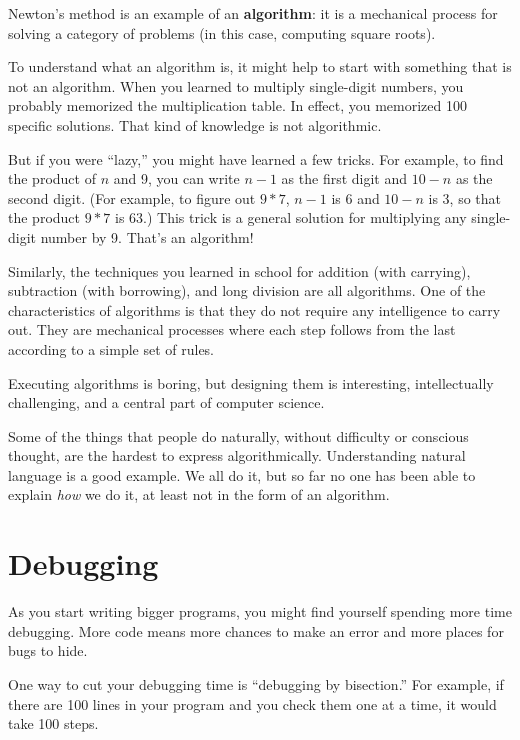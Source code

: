 Newton's method is an example of an {\bf algorithm}: it is a
mechanical process for solving a category of problems (in this
case, computing square roots).

To understand what an algorithm is, it might help to start with
something that is not an algorithm.  When you learned to multiply
single-digit numbers, you probably memorized the multiplication table.
In effect, you memorized 100 specific solutions.  That kind of
knowledge is not algorithmic.

But if you were ``lazy,'' you might have learned a few
tricks.  For example, to find the product of $n$ and 9, you can
write $n-1$ as the first digit and $10-n$ as the second
digit.  (For example, to figure out $9*7$, $n-1$ is 6 and 
$10-n$ is 3, so that the product $9*7$ is 63.) This trick 
is a general solution for multiplying any single-digit 
number by 9.  That's an algorithm!

Similarly, the techniques you learned in school for addition 
(with carrying), subtraction (with borrowing), and long 
division are all algorithms.  One
of the characteristics of algorithms is that they do not require any
intelligence to carry out.  They are mechanical processes where
each step follows from the last according to a simple set of rules.

Executing algorithms is boring, but designing them is interesting,
intellectually challenging, and a central part of computer science.

Some of the things that people do naturally, without difficulty or
conscious thought, are the hardest to express algorithmically.
Understanding natural language is a good example.  We all do it, but
so far no one has been able to explain {\em how} we do it, at least
not in the form of an algorithm.


\section{Debugging}
\label{bisectbug}

As you start writing bigger programs, you might find yourself
spending more time debugging.  More code means more chances to
make an error and more places for bugs to hide.

One way to cut your debugging time is ``debugging by bisection.''
For example, if there are 100 lines in your program and you
check them one at a time, it would take 100 steps.

